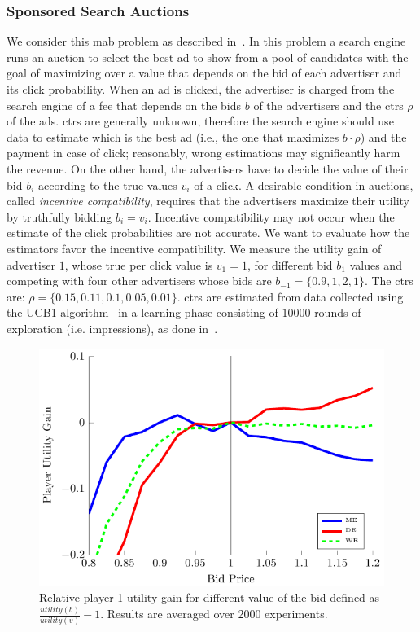 \subsubsection{Sponsored Search Auctions}
We consider this \gls{mab} problem as described in~\cite{xu2013mab}. In this problem a search engine runs an auction to select the best ad to show from a pool of candidates with the goal of maximizing over a value that depends on the bid of each advertiser and its click probability. 
When an ad is clicked, the advertiser is charged from the search engine of a fee that depends on the bids $b$ of the advertisers and the \glspl{ctr} $\rho$ of the ads. 
\glspl{ctr} are generally unknown, therefore the search engine should use data to estimate which is the best ad (i.e., the one that maximizes $b\cdot\rho$) and the payment in case of click; reasonably, wrong estimations may significantly harm the revenue.
On the other hand, the advertisers have to decide the value of their bid $b_i$ according to the true values $v_i$ of a click. A desirable condition in auctions, called \textit{incentive compatibility}, requires that the advertisers maximize their utility by truthfully bidding $b_i = v_i$. Incentive compatibility may not occur when the estimate of the click probabilities are not accurate. We want to evaluate how the estimators favor the incentive compatibility.
We measure the utility gain of advertiser $1$, whose true per click value is $v_1 = 1$, for different bid $b_1$ values and competing with four other advertisers whose bids are $b_{-1} = \lbrace 0.9, 1, 2, 1 \rbrace$. The \glspl{ctr} are: $\rho = \lbrace 0.15, 0.11, 0.1, 0.05, 0.01 \rbrace$. 
\glspl{ctr} are estimated from data collected using the UCB1 algorithm~\cite{auer2002finite} in a learning phase consisting of $10000$ rounds of exploration (i.e. impressions), as done in~\cite{xu2013mab}.

\begin{figure}[t]
    \begin{minipage}{\columnwidth}
    \centering 
    \includegraphics[scale=0.9]{./img/sponsoredSearch.pdf}
    \caption[Sponsored search auctions results]{Relative player 1 utility gain for different value of the bid defined as $\frac{utility(b)}{utility(v)} - 1$. Results are averaged over 2000 experiments.}\label{F:spSearch}
    \end{minipage}
\end{figure}

